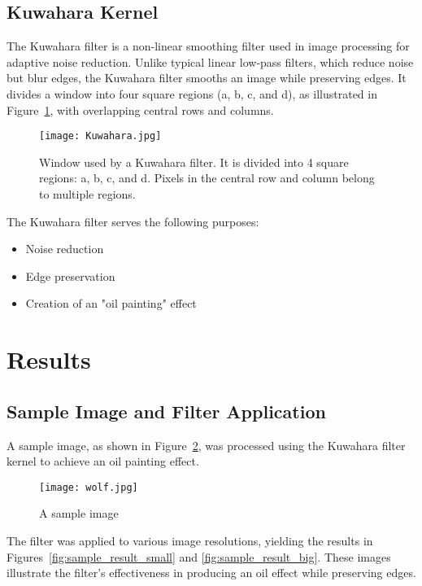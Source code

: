 \documentclass{article}
\begin{document}
    \subsection{Kuwahara Kernel}
    The Kuwahara filter is a non-linear smoothing filter used in image processing for adaptive noise reduction. Unlike typical linear low-pass filters, which reduce noise but blur edges, the Kuwahara filter smooths an image while preserving edges. It divides a window into four square regions (a, b, c, and d), as illustrated in Figure~\ref{fig:kuwahara-window}, with overlapping central rows and columns.

    \begin{figure}
        \centering
        \texttt{[image: Kuwahara.jpg]}
        \caption{Window used by a Kuwahara filter. It is divided into 4 square regions: a, b, c, and d. Pixels in the central row and column belong to multiple regions.}
        \label{fig:kuwahara-window}
    \end{figure}

    The Kuwahara filter serves the following purposes:
    \begin{itemize}
        \item Noise reduction
        \item Edge preservation
        \item Creation of an "oil painting" effect
    \end{itemize}

\section{Results}

    \subsection{Sample Image and Filter Application}
    A sample image, as shown in Figure~\ref{fig:sample-image}, was processed using the Kuwahara filter kernel to achieve an oil painting effect.

    \begin{figure}[H]
        \centering
        \texttt{[image: wolf.jpg]}
        \caption{A sample image}
        \label{fig:sample-image}
    \end{figure}

    The filter was applied to various image resolutions, yielding the results in Figures~\ref{fig:sample_result_small} and \ref{fig:sample_result_big}. These images illustrate the filter's effectiveness in producing an oil effect while preserving edges.
\end{document}
